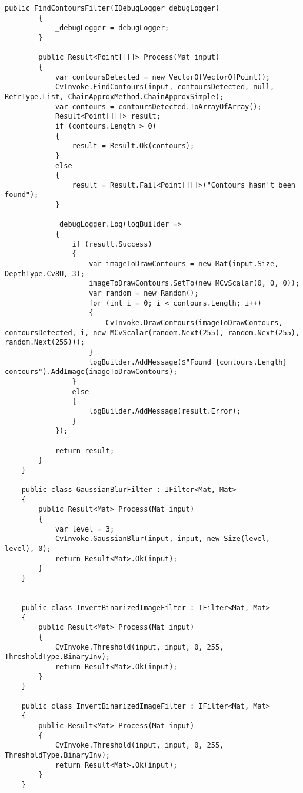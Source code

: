 \begin{lstlisting}[style=fsharpstyle,caption={Исходный код}, label=lst:recognition_result_handler]
        public FindContoursFilter(IDebugLogger debugLogger)
        {
            _debugLogger = debugLogger;
        }

        public Result<Point[][]> Process(Mat input)
        {
            var contoursDetected = new VectorOfVectorOfPoint();
            CvInvoke.FindContours(input, contoursDetected, null, RetrType.List, ChainApproxMethod.ChainApproxSimple);
            var contours = contoursDetected.ToArrayOfArray();
            Result<Point[][]> result;
            if (contours.Length > 0)
            {
                result = Result.Ok(contours);
            }
            else
            {
                result = Result.Fail<Point[][]>("Contours hasn't been found");
            }

            _debugLogger.Log(logBuilder =>
            {
                if (result.Success)
                {
                    var imageToDrawContours = new Mat(input.Size, DepthType.Cv8U, 3);
                    imageToDrawContours.SetTo(new MCvScalar(0, 0, 0));
                    var random = new Random();
                    for (int i = 0; i < contours.Length; i++)
                    {
                        CvInvoke.DrawContours(imageToDrawContours, contoursDetected, i, new MCvScalar(random.Next(255), random.Next(255), random.Next(255)));
                    }
                    logBuilder.AddMessage($"Found {contours.Length} contours").AddImage(imageToDrawContours);
                }
                else
                {
                    logBuilder.AddMessage(result.Error);
                }
            });

            return result;
        }
    }

    public class GaussianBlurFilter : IFilter<Mat, Mat>
    {
        public Result<Mat> Process(Mat input)
        {
            var level = 3;
            CvInvoke.GaussianBlur(input, input, new Size(level, level), 0);
            return Result<Mat>.Ok(input);
        }
    }


    public class InvertBinarizedImageFilter : IFilter<Mat, Mat>
    {
        public Result<Mat> Process(Mat input)
        {
            CvInvoke.Threshold(input, input, 0, 255, ThresholdType.BinaryInv);
            return Result<Mat>.Ok(input);
        }
    }

    public class InvertBinarizedImageFilter : IFilter<Mat, Mat>
    {
        public Result<Mat> Process(Mat input)
        {
            CvInvoke.Threshold(input, input, 0, 255, ThresholdType.BinaryInv);
            return Result<Mat>.Ok(input);
        }
    }


\end{lstlisting}
